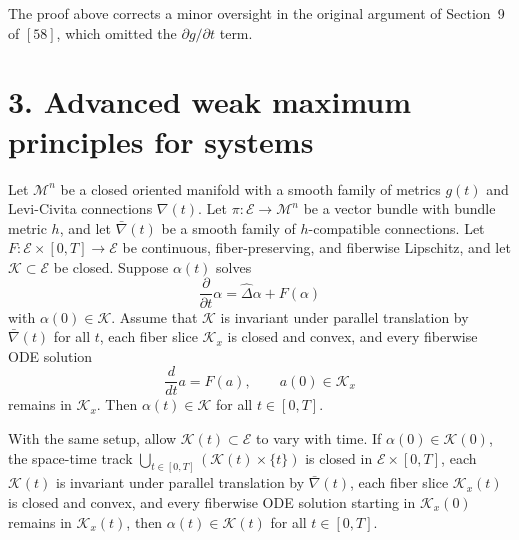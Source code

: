\begin{remark}
\label{ch04-rem-tensor-maximum-principle-oversight}

The proof above corrects a minor oversight in the original argument of Section~9 of \([58]\), which omitted the \(\partial g/\partial t\) term.
\end{remark}

\section*{3. Advanced weak maximum principles for systems}

\begin{theorem}
\label{ch04-thm-tensor-max-principle-ode-pde}

Let \(\mathcal M^n\) be a closed oriented manifold with a smooth family of metrics \(g(t)\) and Levi-Civita connections \(\nabla(t)\). Let \(\pi:\mathcal E\to\mathcal M^n\) be a vector bundle with bundle metric \(h\), and let \(\bar\nabla(t)\) be a smooth family of \(h\)-compatible connections. Let \(F:\mathcal E\times[0,T]\to\mathcal E\) be continuous, fiber-preserving, and fiberwise Lipschitz, and let \(\mathcal K\subset \mathcal E\) be closed. Suppose \(\alpha(t)\) solves
\[
\frac{\partial}{\partial t}\alpha=\hat\Delta\alpha+F(\alpha)
\]
with \(\alpha(0)\in\mathcal K\). Assume that \(\mathcal K\) is invariant under parallel translation by \(\bar\nabla(t)\) for all \(t\), each fiber slice \(\mathcal K_x\) is closed and convex, and every fiberwise ODE solution
\[
\frac{d}{dt}a=F(a),\qquad a(0)\in \mathcal K_x
\]
remains in \(\mathcal K_x\). Then \(\alpha(t)\in\mathcal K\) for all \(t\in[0,T]\).
\end{theorem}

\begin{theorem}
\label{ch04-thm-tensor-max-principle-time-dependent}

With the same setup, allow \(\mathcal K(t)\subset\mathcal E\) to vary with time. If \(\alpha(0)\in \mathcal K(0)\), the space-time track \(\bigcup_{t\in[0,T]}(\mathcal K(t)\times\{t\})\) is closed in \(\mathcal E\times[0,T]\), each \(\mathcal K(t)\) is invariant under parallel translation by \(\bar\nabla(t)\), each fiber slice \(\mathcal K_x(t)\) is closed and convex, and every fiberwise ODE solution starting in \(\mathcal K_x(0)\) remains in \(\mathcal K_x(t)\), then \(\alpha(t)\in\mathcal K(t)\) for all \(t\in[0,T]\).
\end{theorem}

